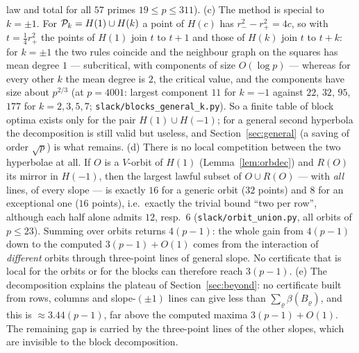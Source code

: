 \begin{remark}
law and total for all $57$ primes $19\le p\le311$).
(c) The method is special to $k=\pm1$.  For $\mathcal{P}_k=H(1)\cup H(k)$ a point of $H(c)$ has $r_-^2-r_+^2=4c$, so with $t=\tfrac14r_+^2$ the points of
$H(1)$ join $t$ to $t+1$ and those of $H(k)$ join $t$ to $t+k$: for $k=\pm1$ the two rules coincide and the neighbour graph on the squares has mean
degree $1$ --- subcritical, with components of size $O(\log p)$ --- whereas for every other $k$ the mean degree is $2$, the critical value, and the
components have size about $p^{2/3}$ (at $p=4001$: largest component $11$ for $k=-1$ against $22$, $32$, $95$, $177$ for $k=2,3,5,7$;
\texttt{slack/blocks\_general\_k.py}).  So a finite table of block optima exists only for the pair $H(1)\cup H(-1)$; for a general second hyperbola
the decomposition is still valid but useless, and Section~\ref{sec:general} (a saving of order $\sqrt p$) is what remains.
(d) There is no local competition between the two hyperbolae at all.  If $O$ is a $V$-orbit of $H(1)$ (Lemma~\ref{lem:orbdec}) and
$R(O)$ its mirror in $H(-1)$, then the largest lawful subset of $O\cup R(O)$ --- with \emph{all} lines, of every slope --- is exactly
$16$ for a generic orbit ($32$ points) and $8$ for an exceptional one ($16$ points), i.e.\ exactly the trivial bound ``two per row'',
although each half alone admits $12$, resp.\ $6$ (\texttt{slack/orbit\_union.py}, all orbits of $p\le23$).  Summing over orbits returns
$4(p-1)$: the whole gain from $4(p-1)$ down to the computed $3(p-1)+O(1)$ comes from the interaction of \emph{different} orbits through
three-point lines of general slope.  No certificate that is local for the orbits or for the blocks can therefore reach $3(p-1)$.
(e) The decomposition explains the plateau of Section~\ref{sec:beyond}: no certificate built from rows, columns and slope-$(\pm1)$ lines can
give less than $\sum_\varrho\beta(B_\varrho)$, and this is $\approx3.44(p-1)$, far above the computed maxima $3(p-1)+O(1)$.  The remaining
gap is carried by the three-point lines of the other slopes, which are invisible to the block decomposition.
\end{remark}
